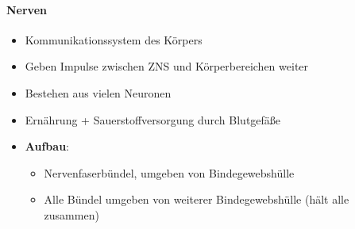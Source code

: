 \paragraph{Nerven}
\begin{itemize}
  \item Kommunikationssystem des Körpers
  \item Geben Impulse zwischen ZNS und Körperbereichen weiter
  \item Bestehen aus vielen Neuronen
  \item Ernährung + Sauerstoffversorgung durch Blutgefäße
  \item \textbf{Aufbau}:
  \begin{itemize}
    \item Nervenfaserbündel, umgeben von Bindegewebshülle
    \item Alle Bündel umgeben von weiterer Bindegewebshülle (hält alle zusammen)
  \end{itemize}
\end{itemize}